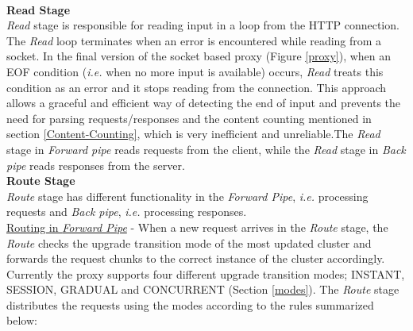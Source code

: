 \documentclass[a4paper,11pt,twoside]{article}
\begin{document}
\noindent\\
\textbf{Read Stage} \\
\textit{Read} stage is responsible for reading input in a loop from the HTTP connection. The \textit{Read} loop terminates when an error is encountered while reading from a socket. In the final version of the socket based proxy (Figure \ref{proxy}), when an EOF condition (\textit{i.e.}  when no more input is available) occurs, \textit{Read} treats this condition as an error and it stops reading from the connection. This approach allows a graceful and efficient way of detecting the end of input and prevents the need for parsing requests/responses and the content counting mentioned in section \ref{Content-Counting}, which is very inefficient and unreliable.The \textit{Read} stage in \textit{Forward pipe} reads requests from the client, while the \textit{Read} stage in \textit{Back pipe} reads responses from the server.   \\

\noindent
\textbf{Route Stage} \\
\textit{Route} stage has different functionality in the \textit{Forward Pipe}, \textit{i.e.} processing requests and \textit{Back pipe}, \textit{i.e.} processing responses. \\   

\noindent
\underline{Routing in \textit{Forward Pipe}} - When a new request arrives in the \textit{Route} stage, the \textit{Route} checks the upgrade transition mode of the most updated cluster and forwards the request chunks to the correct instance of the cluster accordingly. Currently the proxy supports four different upgrade transition modes; INSTANT, SESSION, GRADUAL and CONCURRENT (Section \ref{modes}). The \textit{Route} stage distributes the requests using the modes according to the rules summarized below: 
\end{document}
